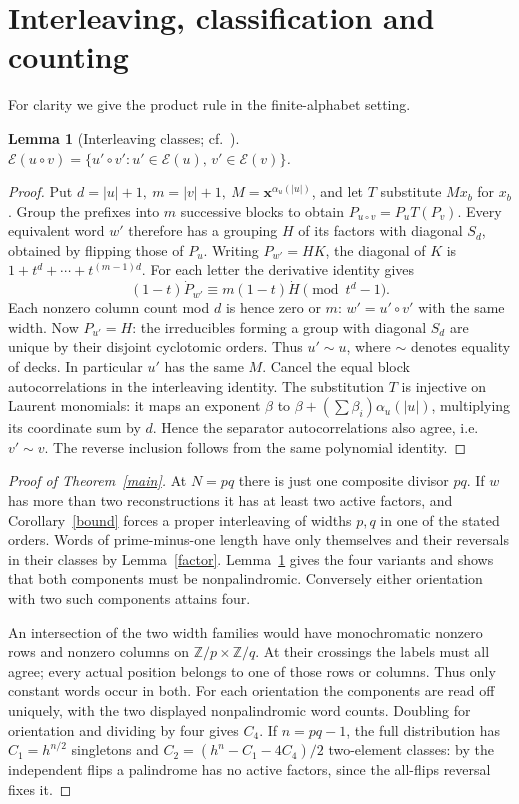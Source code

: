 \documentclass[11pt]{article}
\newtheorem{lemma}[theorem]{Lemma}
\newcommand{\Z}{\mathbb Z}
\newcommand{\E}{\mathcal E}
\newcommand{\X}{\mathbf x}
\begin{document}
\section{Interleaving, classification and counting}
For clarity we give the product rule in the finite-alphabet setting.
\begin{lemma}[Interleaving classes; cf.\ {\cite[Thm.~26]{admop}}]\label{inter}
\(\E(u\circ v)=\{u'\circ v':u'\in\E(u),\,v'\in\E(v)\}\).
\end{lemma}
\begin{proof}
Put \(d=|u|+1,\ m=|v|+1,\ M=\X^{\alpha_u(|u|)}\), and let \(T\) substitute \(M x_b\) for \(x_b\). Group the prefixes into \(m\) successive blocks to obtain \(P_{u\circ v}=P_u T(P_v)\). Every equivalent word \(w'\) therefore has a grouping \(H\) of its factors with diagonal \(S_d\), obtained by flipping those of \(P_u\). Writing \(P_{w'}=HK\), the diagonal of \(K\) is \(1+t^d+\cdots+t^{(m-1)d}\). For each letter the derivative identity gives
\[
 (1-t)\dot P_{w'}\equiv m(1-t)\dot H\pmod{t^d-1}.
\]
Each nonzero column count mod \(d\) is hence zero or \(m\): \(w'=u'\circ v'\) with the same width. Now \(P_{u'}=H\): the irreducibles forming a group with diagonal \(S_d\) are unique by their disjoint cyclotomic orders. Thus \(u'\sim u\), where \(\sim\) denotes equality of decks. In particular \(u'\) has the same \(M\). Cancel the equal block autocorrelations in the interleaving identity. The substitution \(T\) is injective on Laurent monomials: it maps an exponent \(\beta\) to \(\beta+(\sum\beta_i)\alpha_u(|u|)\), multiplying its coordinate sum by \(d\). Hence the separator autocorrelations also agree, i.e.\ \(v'\sim v\). The reverse inclusion follows from the same polynomial identity.
\end{proof}
\begin{proof}[Proof of Theorem~\ref{main}]
At \(N=pq\) there is just one composite divisor \(pq\). If \(w\) has more than two reconstructions it has at least two active factors, and Corollary~\ref{bound} forces a proper interleaving of widths \(p,q\) in one of the stated orders. Words of prime-minus-one length have only themselves and their reversals in their classes by Lemma~\ref{factor}. Lemma~\ref{inter} gives the four variants and shows that both components must be nonpalindromic. Conversely either orientation with two such components attains four.

An intersection of the two width families would have monochromatic nonzero rows and nonzero columns on \(\Z/p\times\Z/q\). At their crossings the labels must all agree; every actual position belongs to one of those rows or columns. Thus only constant words occur in both. For each orientation the components are read off uniquely, with the two displayed nonpalindromic word counts. Doubling for orientation and dividing by four gives \(C_4\). If \(n=pq-1\), the full distribution has \(C_1=h^{n/2}\) singletons and \(C_2=(h^n-C_1-4C_4)/2\) two-element classes: by the independent flips a palindrome has no active factors, since the all-flips reversal fixes it.
\end{proof}
\end{document}
